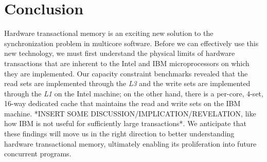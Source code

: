 \section{Conclusion}
Hardware transactional memory is an exciting new solution to the synchronization
problem in multicore software. Before we can effectively use this new
technology, we must first understand the physical limits of hardware
transactions that are inherent to the Intel and IBM microprocessors on which
they are implemented. Our capacity constraint benchmarks revealed that the read
sets are implemented through the \textit{L3} and the write sets are implemented
through the \textit{L1} on the Intel machine; on the other hand, there is a
per-core, 4-set, 16-way dedicated cache that maintains the read and write sets
on the IBM machine. *INSERT SOME DISCUSSION/IMPLICATION/REVELATION, like how IBM
is not useful for sufficiently large transactions*. We anticipate that these
findings will move us in the right direction to better understanding hardware
transactional memory, ultimately enabling its proliferation into future
concurrent programs.
 
